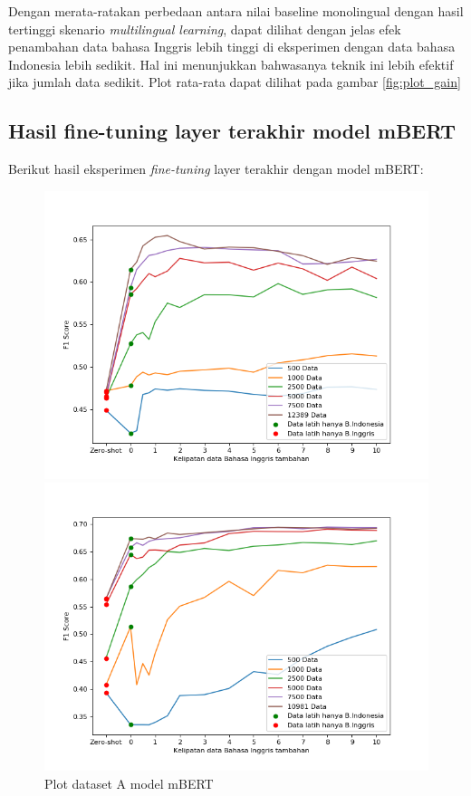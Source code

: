         Dengan merata-ratakan perbedaan antara nilai baseline monolingual dengan hasil tertinggi skenario \textit{multilingual learning}, dapat dilihat dengan jelas efek penambahan data bahasa Inggris lebih tinggi di eksperimen dengan data bahasa Indonesia lebih sedikit. Hal ini menunjukkan bahwasanya teknik ini lebih efektif jika jumlah data sedikit. Plot rata-rata dapat dilihat pada gambar \ref{fig:plot_gain}

    \subsection{Hasil fine-tuning layer terakhir model mBERT}
        Berikut hasil eksperimen \textit{fine-tuning} layer terakhir dengan model mBERT: 
        \begin{figure}[htb]
            \minipage{0.33\paperwidth}
            \includegraphics[width=\linewidth]{resources/plot-head-trip-mbert.png}
            \caption{Plot dataset A model mBERT}
            \label{fig:plot_head_trip_mbert}
            \endminipage\hfill
            \minipage{0.33\paperwidth}
            \includegraphics[width=\linewidth]{resources/plot-head-prosa-mbert.png}

\end{figure}
